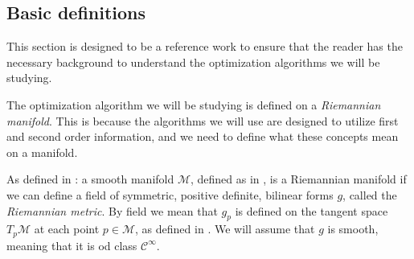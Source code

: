 \subsection{Basic definitions}
This section is designed to be a reference work to ensure that the reader has the necessary background to understand the optimization algorithms we will be studying. 

The optimization algorithm we will be studying is defined on a \textit{Riemannian manifold}. This is because the algorithms we will use are designed to utilize first and second order information, and we need to define what these concepts mean on a manifold. 





\begin{definition}
    As defined in \cite[def~2.6,~p.~179]{Boothby1975}: a \textup{smooth manifold} $\mathcal{M}$, defined as in \cite[p.~13]{Lee2012:1},  is a \textup{Riemannian manifold} if we can define a field of symmetric, positive definite, bilinear forms $g$, called the \textit{Riemannian metric}. By field we mean that $g_p$ is defined on the tangent space $T_p\mathcal{M}$ at each point $p\in \mathcal{M}$, as defined in \cite[def~2.1,~p.~178]{Boothby1975}. We will assume that $g$ is smooth, meaning that it is od class $\mathcal{C}^\infty$.
\end{definition}

